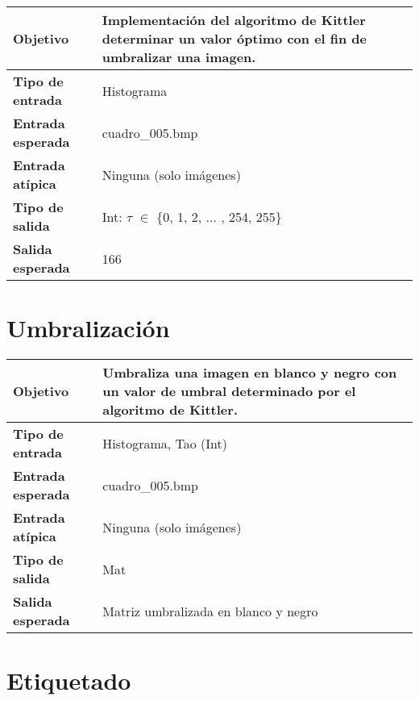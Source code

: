 \documentclass{scrreprt}
\begin{document}
\vspace{0.3cm}
\begin{center}
    \begin{tabular}{|p{4.0cm}|p{9.0cm}|}
        \hline
	    \textbf{Objetivo} & Implementación del algoritmo de Kittler determinar un valor óptimo con el fin de umbralizar una imagen. \\
        \hline
	    \textbf{Tipo de entrada} & Histograma \\
        \hline
	    \textbf{Entrada esperada} & cuadro_005.bmp \\
        \hline
	    \textbf{Entrada atípica} & Ninguna (solo imágenes) \\
        \hline
	    \textbf{Tipo de salida} & Int: \(\tau\) \(\in\) \{0, 1, 2, ... , 254, 255\} \\
        \hline
	    \textbf{Salida esperada} & 166 \\
        \hline        
    \end{tabular}
\end{center}


\section{Umbralización}

\vspace{0.3cm}
\begin{center}
    \begin{tabular}{|p{4.0cm}|p{9.0cm}|}
        \hline
	    \textbf{Objetivo} & Umbraliza una imagen en blanco y negro con un valor de umbral determinado por el algoritmo de Kittler.\\
        \hline
	    \textbf{Tipo de entrada} & Histograma, Tao (Int) \\
        \hline
	    \textbf{Entrada esperada} & cuadro_005.bmp \\
        \hline
	    \textbf{Entrada atípica} & Ninguna (solo imágenes) \\
        \hline
	    \textbf{Tipo de salida} & Mat \\
        \hline
	    \textbf{Salida esperada} & Matriz umbralizada en blanco y negro \\
        \hline        
    \end{tabular}
\end{center}


\section{Etiquetado}
\end{document}

